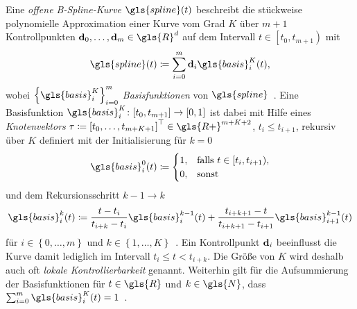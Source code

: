 Eine \emph{offene B-Spline-Kurve} $\gls{spline}\left(t\right)$ beschreibt die stückweise polynomielle Approximation einer Kurve vom Grad $K$ über $m + 1$ Kontrollpunkten $\ve{d}_0, \ldots, \ve{d}_m \in \gls{R}^d$ auf dem Intervall $t \in \left[t_0, t_{m+1}\right)$ mit
\begin{equation}
  \gls{spline}\left(t\right) \coloneqq \sum_{i = 0}^m \ve{d}_i \gls{basis}_i^K\left(t\right),
    \label{eq:bspline}
\end{equation}
wobei ${\left\{\gls{basis}_i^K\right\}}_{i=0}^m$ \emph{Basisfunktionen} von $\gls{spline}$~\cite{deBoor}.
Eine Basisfunktion $\gls{basis}_i^K \colon \left[t_0, t_{m+1}\right] \to \left[0, 1\right]$ ist dabei mit Hilfe eines \emph{Knotenvektors} $\ve{\tau} \coloneqq {\left[t_0, \ldots, t_{m+K+1}\right]}^{\top} \in \gls{R+}^{m+K+2}$, $t_i \leq t_{i+1}$, rekursiv über $K$ definiert mit der Initialisierung für $k=0$
\begin{equation}
  \gls{basis}_i^0\left(t\right) \coloneqq \begin{cases}
    1, & \text{falls }t \in \left[t_i, t_{i+1}\right),\\
    0, & \text{sonst}
    \label{eq:bspline_basis_init}
  \end{cases}
\end{equation}
und dem Rekursionsschritt $k - 1 \rightarrow k$
\begin{equation}
  \gls{basis}_i^k\left(t\right) \coloneqq \frac{t-t_i}{t_{i+k} - t_i}\gls{basis}^{k-1}_i\left(t\right) + \frac{t_{i+k+1} - t}{t_{i+k+1} - t_{i+1}} \gls{basis}_{i+1}^{k-1}\left(t\right)
    \label{eq:bspline_basis_schritt}
\end{equation}
für $i \in \left\{ 0, \ldots, m \right\}$ und $k \in \left\{1, \ldots, K \right\}$~\cite{deBoor}.
Ein Kontrollpunkt $\mathbf{d}_i$ beeinflusst die Kurve damit lediglich im Intervall $t_i \leq t < t_{i+k}$.
Die Größe von $K$ wird deshalb auch oft \emph{lokale Kontrollierbarkeit} genannt.
Weiterhin gilt für die Aufsummierung der Basisfunktionen für $t \in \gls{R}$ und $k \in \gls{N}$, dass $\sum_{i=0}^m \gls{basis}_i^K\left(t\right) = 1$~\cite{deBoor}.

